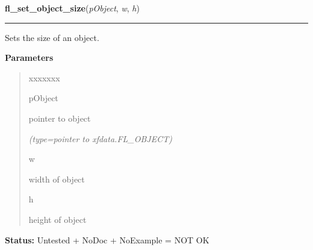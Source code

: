 \hspace{.8\funcindent}\begin{boxedminipage}{\funcwidth}

    \raggedright \textbf{fl\_set\_object\_size}(\textit{pObject}, \textit{w}, \textit{h})

    \vspace{-1.5ex}

    \rule{\textwidth}{0.5\fboxrule}
\setlength{\parskip}{2ex}
    Sets the size of an object.

\setlength{\parskip}{1ex}
      \textbf{Parameters}
      \vspace{-1ex}

      \begin{quote}
        \begin{Ventry}{xxxxxxx}

          \item[pObject]

          pointer to object

            {\it (type=pointer to xfdata.FL\_OBJECT)}

          \item[w]

          width of object

          \item[h]

          height of object

        \end{Ventry}

      \end{quote}

\textbf{Status:} Untested + NoDoc + NoExample = NOT OK



    \end{boxedminipage}

    \label{xformslib:library:fl_set_object_automatic}

    \vspace{0.5ex}

